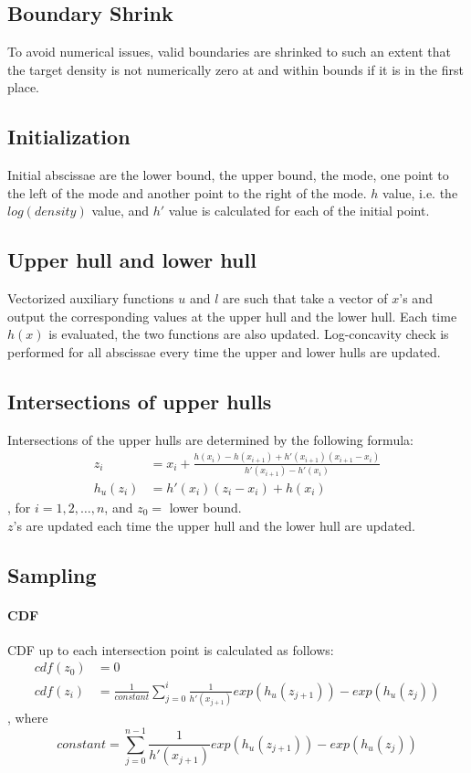 \documentclass{article}\usepackage[]{graphicx}\usepackage[]{color}
\begin{document}
\subsection{Boundary Shrink}
To avoid numerical issues, valid boundaries are shrinked to such an extent that 
the target density is not numerically zero at and within bounds if it is in the 
first place.

\subsection{Initialization}
Initial abscissae are the lower bound, the upper bound, the mode, one point to
the left of the mode and another point to the right of the mode. $h$ value, i.e.
the $log(density)$ value, and $h'$ value is calculated for each of the initial
point.

\subsection{Upper hull and lower hull}
Vectorized auxiliary functions $u$ and $l$ are such that take a vector of $x$'s 
and output the corresponding values at the upper hull and the lower hull. Each time
$h(x)$ is evaluated, the two functions are also updated. Log-concavity check is
performed for all abscissae every time the upper and lower hulls are updated.

\subsection{Intersections of upper hulls}
Intersections of the upper hulls are determined by the following formula:\\
\begin{align*}
z_i &= x_i + \frac{h(x_i) - h(x_{i+1}) + h'(x_{i+1})(x_{i+1} - x_i)}{h'(x_{i+1}) - h'(x_i)}\\
h_u(z_i) &= h'(x_i)(z_i - x_i) + h(x_i)
\end{align*}
, for $i = 1, 2, \dots, n$, and $z_0 = $ lower bound.\\
$z$'s are updated each time the upper hull and the lower hull are updated.

\subsection{Sampling}
\paragraph{CDF}
CDF up to each intersection point is calculated as follows:\\
\begin{align*}
cdf(z_0) &= 0\\
cdf(z_i) &= \frac{1}{constant}\sum_{j = 0}^{i} \frac{1}{h'(x_{j+1})}{exp(h_u(z_{j+1})) - exp(h_u(z_{j}))}
\end{align*}
, where $$constant = \sum_{j = 0}^{n-1} \frac{1}{h'(x_{j+1})}{exp(h_u(z_{j+1})) - exp(h_u(z_{j}))}$$
\end{document}

